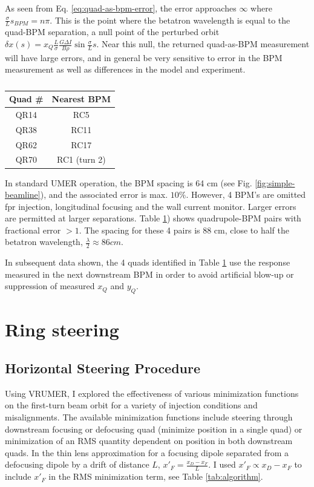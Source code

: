 As seen from Eq. \ref{eq:quad-as-bpm-error}, the error approaches $\infty$ where $\frac{\sigma}{L}s_{BPM} = n\pi$. This is the point where the betatron wavelength is equal to the quad-BPM separation, a null point of the perturbed orbit $\delta x(s) = x_Q \frac{L}{\sigma} \frac{G \Delta I}{B\rho} \sin{\frac{\sigma}{L}s}$. Near this null, the returned quad-as-BPM measurement will have large errors, and in general be very sensitive to error in the BPM measurement as well as differences in the model and experiment. 


\begin{table}
\centering
\caption{}
\label{tab:nulls}
\begin{tabular}{|c|c|}
Quad \# & Nearest BPM  \\
\hline
QR14 & RC5  \\
QR38 & RC11  \\
QR62 & RC17  \\
QR70 & RC1 (turn 2)  \\
\end{tabular}
\end{table}


In standard UMER operation, the BPM spacing is 64 cm (see Fig. \ref{fig:simple-beamline}), and the associated error is max. $10\%$. However, 4 BPM's are omitted fpr injection, longitudinal focusing and the wall current monitor. Larger errors are permitted at larger separations. 
Table \ref{tab:nulls}) shows quadrupole-BPM pairs with fractional error $>1$. The spacing for these 4 pairs is 88 cm, close to half the betatron wavelength, $\frac{\lambda}{2} \approx 86 cm$. 

In subsequent data shown, the 4 quads identified in Table \ref{tab:nulls} use the response measured in the next downstream BPM in order to avoid artificial blow-up or suppression of measured $x_Q$ and $y_Q$. 



\section{Ring steering} \label{sec:steering:ringsteering}




\subsection{Horizontal Steering Procedure}

Using VRUMER, I explored the effectiveness of various minimization functions on the first-turn beam orbit for a variety of injection conditions and misalignments. The available minimization functions include steering through downstream focusing or defocusing quad (minimize position in a single quad) or minimization of an RMS quantity dependent on position in both downstream quads. In the thin lens approximation for a focusing dipole separated from a defocusing dipole by a drift of distance $L$, $x'_F = \frac{x_D-x_F}{L}$. I used $x'_F \propto x_D-x_F$ to include $x'_F$ in the RMS minimization term, see Table \ref{tab:algorithm}.

